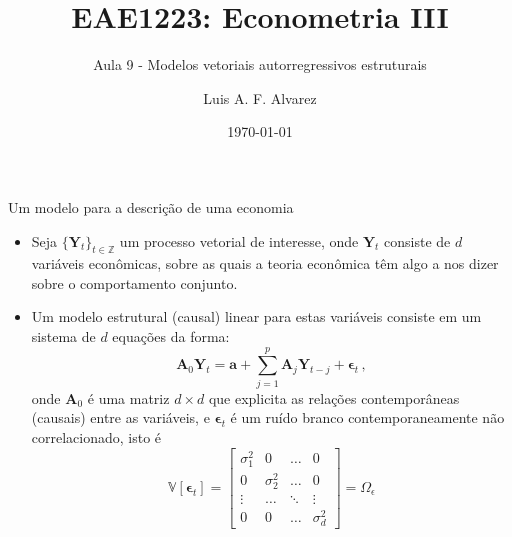 \documentclass[11pt]{beamer}
\author{Luis A. F. Alvarez}
\title{EAE1223: Econometria III}
\subtitle{Aula 9 - Modelos vetoriais autorregressivos estruturais}
\date{\today}
\begin{document}
\begin{frame}[plain]
	\maketitle
\end{frame}

\begin{frame}{Um modelo para a descrição de uma economia}
	\begin{itemize}
		\item 	Seja $\{ \boldsymbol{Y}_t\}_{t\in \mathbb{Z}}$ um processo vetorial de interesse, onde $\boldsymbol{Y}_t$ consiste de $d$ variáveis econômicas, sobre as quais a teoria econômica têm algo a nos dizer sobre o comportamento conjunto.
		\item Um {\color{blue}modelo estrutural (causal) linear} para estas variáveis consiste em um sistema de $d$ equações da forma:
		\begin{equation} \label{eq_struct}
			\boldsymbol{A}_0 \boldsymbol{Y}_t = \boldsymbol{a} + \sum_{j=1}^p\boldsymbol{A}_j \boldsymbol{Y}_{t-j} + \boldsymbol{\epsilon}_t\, ,
		\end{equation}
		onde $\boldsymbol{A}_0$ é uma matriz $d \times d$ que explicita as relações contemporâneas (causais) entre as variáveis, e $\boldsymbol{\epsilon}_t$ é um ruído branco {\color{blue}contemporaneamente não correlacionado}, isto é $$ \mathbb{V}[\boldsymbol{\epsilon}_t] = \begin{bmatrix}
			\sigma_{1}^2 & 0 & \ldots & 0 \\
			0 & \sigma^2_2 & \ldots & 0 \\
			\vdots & \ldots & \ddots & \vdots \\
			0 & 0 & \ldots & \sigma^2_d
		\end{bmatrix}= \Omega_\epsilon $$
		\end{itemize}


\end{frame}
\end{document}

